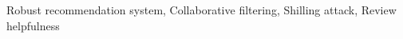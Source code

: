 \documentclass[master,english,final]{kaist-ucs}
\begin{document}
\begin{abstract}


    \end{abstract}

    \begin{Engkeyword}
    Robust recommendation system, Collaborative filtering, Shilling attack, Review helpfulness
    \end{Engkeyword}
\end{document}
